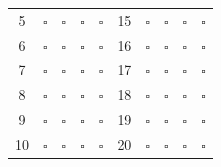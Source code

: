 {\begin{center}
\begin{tabular}{
                c|cccc
                @{\qquad\qquad}
                c|cccc
            }
            5  & $\square$ & $\square$ & $\square$ & $\square$ &
            15 & $\square$ & $\square$ & $\square$ & $\square$ \\

            6  & $\square$ & $\square$ & $\square$ & $\square$ &
            16 & $\square$ & $\square$ & $\square$ & $\square$ \\

            7  & $\square$ & $\square$ & $\square$ & $\square$ &
            17 & $\square$ & $\square$ & $\square$ & $\square$ \\

            8  & $\square$ & $\square$ & $\square$ & $\square$ &
            18 & $\square$ & $\square$ & $\square$ & $\square$ \\

            9  & $\square$ & $\square$ & $\square$ & $\square$ &
            19 & $\square$ & $\square$ & $\square$ & $\square$ \\

            10 & $\square$ & $\square$ & $\square$ & $\square$ &
            20 & $\square$ & $\square$ & $\square$ & $\square$ \\

            \bottomrule
        \end{tabular}


        \else


        \fi
        \fi
        \fi
        \fi

    \end{center}
}

\newcommand{\ObservationLines}{%
    \par\vspace{3mm}
    \rule{\linewidth}{0.3pt}
    \par\vspace{3mm}
    \rule{\linewidth}{0.3pt}
}

